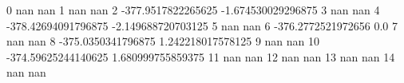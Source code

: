 0 nan nan
1 nan nan
2 -377.9517822265625 -1.674530029296875
3 nan nan
4 -378.42694091796875 -2.149688720703125
5 nan nan
6 -376.2772521972656 0.0
7 nan nan
8 -375.0350341796875 1.242218017578125
9 nan nan
10 -374.59625244140625 1.680999755859375
11 nan nan
12 nan nan
13 nan nan
14 nan nan

